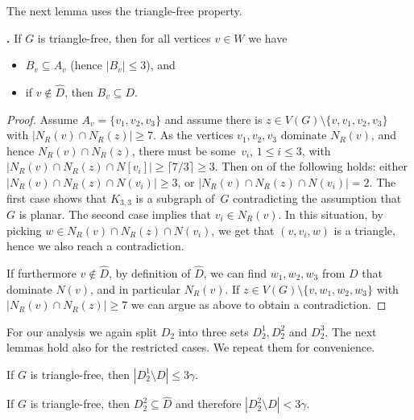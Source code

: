 The next lemma uses the triangle-free property.

\begin{alemma}\label{alem:dominating-dominators}\hspace{-1.7mm}\textbf{.}
  If $G$ is triangle-free, then for all vertices $v\in W$ we have

  \vspace{-5pt}
  \begin{itemize}
  \item $B_v \subseteq A_v$ (hence $|B_v|\le 3$), and \smallskip
  \item if $v\not\in \hat{D}$, then $B_v\subseteq D$.
  \end{itemize}
\end{alemma}
\begin{proof}
  Assume $A_v=\{v_1,v_2, v_3\}$ and assume there is $z\in V(G)\setminus \{v,v_1,v_2, v_3\}$
  with $|N_R(v) \cap N_R(z)| \geq 7$.
  As the vertices $v_1, v_2, v_3$ dominate $N_R(v)$, and hence $N_R(v)\cap N_R(z)$,
  there must be some~$v_i$, $1\leq i\leq 3$, with
  \mbox{$|N_R(v) \cap N_R(z) \cap N[v_i]| \geq \lceil 7/3\rceil \geq 3$}.
  Then on of the following holds: either
  \mbox{$|N_R(v) \cap N_R(z) \cap N(v_i)| \geq 3$},  or
  \mbox{$|N_R(v) \cap N_R(z) \cap N(v_i)| =2$}.
  The first case shows that $K_{3,3}$ is a subgraph of~$G$
  contradicting the assumption that $G$ is planar.
  The second case implies that $v_i\in N_R(v)$. In this situation, by picking
  $w \in N_R(v) \cap N_R(z) \cap N(v_i)$, we get that $(v,v_i,w)$ is a triangle,
  hence we also reach a contradiction.

  If furthermore $v\not\in \hat{D}$, by definition of $\hat{D}$,
  we can find $w_1,w_2, w_3$ from $D$
  that dominate $N(v)$, and in particular $N_R(v)$.
  If $z\in V(G)\setminus \{v,w_1,w_2, w_3\}$
  with $|N_R(v) \cap N_R(z)| \geq 7$ we can argue as above to obtain
  a contradiction.
\end{proof}


For our analysis we again split $D_2$ into three sets $D_2^1, D_2^2$ and
$D_2^3$. The next lemmas hold also for the restricted cases. We repeat
them for convenience.

\begin{alemma}\label{alem:size-D21}
  If $G$ is triangle-free, then $|D_2^1\setminus D|\leq 3\gamma$.
\end{alemma}

\begin{alemma}\label{alem:size-D22}
  If $G$ is triangle-free, then $D_2^2 \subseteq \hat D$ and therefore
  $|D_2^2\setminus D|< 3\gamma$.
\end{alemma}

